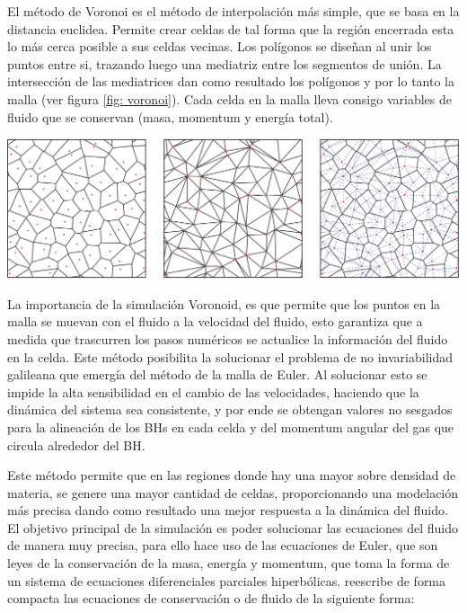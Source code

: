 El método de Voronoi es el método de interpolación más simple, que se basa en la distancia euclidea. Permite crear celdas de tal forma que la región encerrada esta lo más cerca posible a sus celdas vecinas. Los polígonos se diseñan al unir los puntos entre si, trazando luego una mediatriz entre los segmentos de unión. La intersección de las mediatrices dan como resultado los polígonos y por lo tanto la malla (ver figura \ref{fig: voronoi}). Cada celda en la malla lleva consigo variables de fluido que se conservan (masa, momentum y energía total).
%
\begin{center}
\includegraphics[scale=.35]{./figures/5_Algoritmo_Modelacion/voronoi.png}
\label{fig: voronoi}
\end{center}
%
La importancia de la simulación Voronoid, es que permite que los puntos en la malla se muevan con el fluido a la velocidad del fluido, esto garantiza que a medida que trascurren los pasos numéricos se actualice la información del fluido en la celda. Este método posibilita la solucionar el problema de no invariabilidad galileana que emergía del método de la malla de Euler. Al solucionar esto se impide la alta sensibilidad en el cambio de las velocidades, haciendo que la dinámica del sistema sea consistente, y por ende se obtengan valores no sesgados para la alineación de los BHs en cada celda y del momentum angular del gas que circula alrededor del BH. 

Este método permite que en las regiones donde hay una mayor sobre densidad de materia, se genere una mayor cantidad de celdas, proporcionando una modelación más precisa dando como resultado una mejor respuesta a la dinámica del fluido.
El objetivo principal de la simulación es poder solucionar las ecuaciones del fluido de manera muy precisa, para ello hace uso de las ecuaciones de Euler, que son leyes de la conservación de la masa, energía y momentum, que toma la forma de un sistema de ecuaciones diferenciales parciales hiperbólicas. \cite{springel2010} reescribe de forma compacta las ecuaciones de conservación o de fluido de la siguiente forma:

